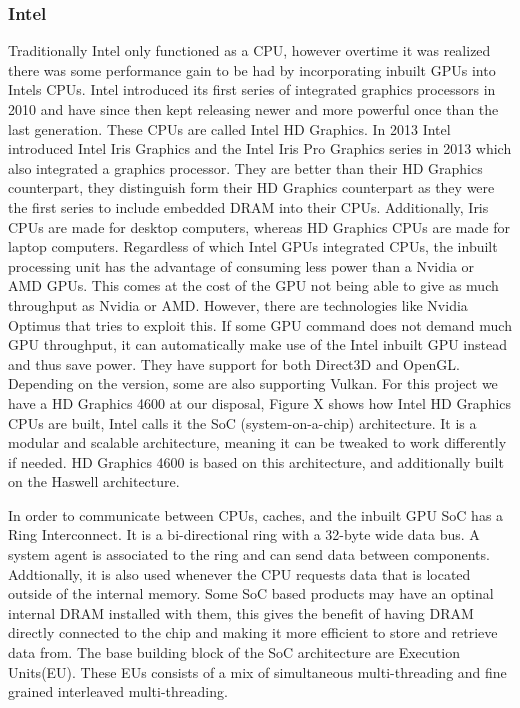 \subsubsection{Intel}
Traditionally Intel only functioned as a \gls{CPU}, however overtime it was realized there was some performance gain to be had by incorporating inbuilt \glspl{GPU} into Intels \glspl{CPU}.
Intel introduced its first series of integrated graphics processors in 2010 and have since then kept releasing newer and more powerful once than the last generation. 
These \glspl{CPU} are called Intel HD Graphics. 
In 2013 Intel introduced Intel Iris Graphics and the Intel Iris Pro Graphics series in 2013 which also integrated a graphics processor. 
They are better than their HD Graphics counterpart, they distinguish form their HD Graphics counterpart as they were the first series to include embedded DRAM into their \glspl{CPU}. 
Additionally, Iris \glspl{CPU} are made for desktop computers, whereas HD Graphics \glspl{CPU} are made for laptop computers.
Regardless of which Intel \glspl{GPU} integrated \glspl{CPU}, the inbuilt processing unit has the advantage of consuming less power than a Nvidia or AMD \glspl{GPU}.
This comes at the cost of the \gls{GPU} not being able to give as much throughput as Nvidia or AMD. 
However, there are technologies like Nvidia Optimus that tries to exploit this. 
If some GPU command does not demand much \gls{GPU} throughput, it can automatically make use of the Intel inbuilt \gls{GPU} instead and thus save power.
They have support for both Direct3D and OpenGL. Depending on the version, some are also supporting Vulkan.
For this project we have a HD Graphics 4600 at our disposal, Figure X shows how Intel HD Graphics \glspl{CPU} are built, Intel calls it the SoC (system-on-a-chip) architecture. It is a modular and scalable architecture, meaning it can be tweaked to work differently if needed. HD Graphics 4600 is based on this architecture, and additionally built on the Haswell architecture. 

In order to communicate between \glspl{CPU}, caches, and the inbuilt \gls{GPU} SoC has a Ring Interconnect. It is a bi-directional ring with a 32-byte wide data bus. A system agent is associated to the ring and can send data between components. Addtionally, it is also used whenever the \gls{CPU} requests data that is located outside of the internal memory. 
Some SoC based products may have an optinal internal DRAM installed with them, this gives the benefit of having DRAM directly connected to the chip and making it more efficient to store and retrieve data from.
The base building block of the SoC architecture are Execution Units(EU). These EUs consists of a mix of simultaneous multi-threading and fine grained interleaved multi-threading. 

